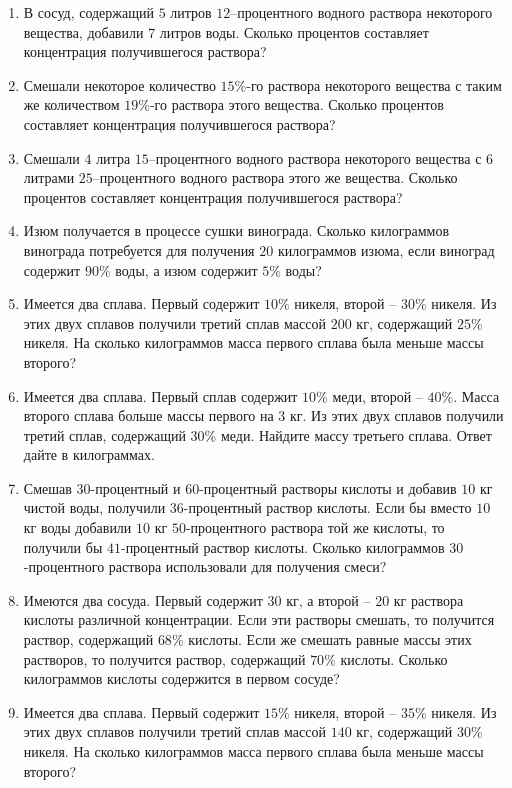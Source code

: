 \documentclass[12pt, a4paper]{article}
\begin{document}
	
	\begin{enumerate}
		\item В сосуд, содержащий $5$ литров $12$–процентного водного раствора некоторого вещества, добавили $7$ литров воды. Сколько процентов составляет концентрация получившегося раствора?
		\item Смешали некоторое количество $15\%$-го раствора некоторого вещества с таким же количеством $19\%$-го раствора этого вещества. Сколько процентов составляет концентрация получившегося раствора?
		\item Смешали $4$ литра $15$–процентного водного раствора некоторого вещества с $6$ литрами $25$–процентного водного раствора этого же вещества. Сколько процентов составляет концентрация получившегося раствора?
		\item Изюм получается в процессе сушки винограда. Сколько килограммов винограда потребуется для получения $20$ килограммов изюма, если виноград содержит $90\%$ воды, а изюм содержит $5\%$ воды?
		\item Имеется два сплава. Первый содержит $10\%$ никеля, второй – $30\%$ никеля. Из этих двух сплавов получили третий сплав массой $200$ кг, содержащий $25\%$ никеля. На сколько килограммов масса первого сплава была меньше массы второго?
		\item Имеется два сплава. Первый сплав содержит $10\%$ меди, второй – $40\%$. Масса второго сплава больше массы первого на $3$ кг. Из этих двух сплавов получили третий сплав, содержащий $30\%$ меди. Найдите массу третьего сплава. Ответ дайте в килограммах.
		\item Смешав $30$-процентный и $60$-процентный растворы кислоты и добавив $10$ кг чистой воды, получили 36-процентный раствор кислоты. Если бы вместо $10$ кг воды добавили $10$ кг $50$-процентного раствора той же кислоты, то получили бы $41$-процентный раствор кислоты. Сколько килограммов $30$-процентного раствора использовали для получения смеси?
		\item Имеются два сосуда. Первый содержит $30$ кг, а второй – $20$ кг раствора кислоты различной концентрации. Если эти растворы смешать, то получится раствор, содержащий $68\%$ кислоты. Если же смешать равные массы этих растворов, то получится раствор, содержащий $70\%$ кислоты. Сколько килограммов кислоты содержится в первом сосуде?
		\item Имеется два сплава. Первый содержит $15\%$ никеля, второй – $35\%$ никеля. Из этих двух сплавов получили третий сплав массой $140$ кг, содержащий $30\%$ никеля. На сколько килограммов масса первого сплава была меньше массы второго?
	\end{enumerate}
\end{document}
